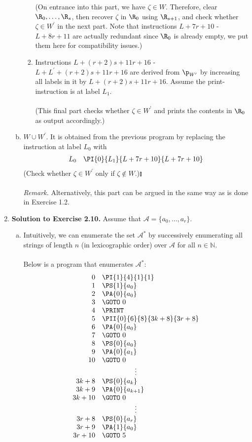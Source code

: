 \begin{enumerate}[1.]
\begin{enumerate}[(a)]
\begin{enumerate}[(1)]
\[\]
(On entrance into this part, we have $\zeta \in W$. Therefore, clear $\R_0, \ldots, \R_s$, then recover $\zeta$ in $\R_0$ using $\R_{s + 1}$, and check whether $\zeta \in W^\prime$ in the next part. Note that instructions $L + 7r + 10$ - $L + 8r + 11$ are actually redundant since $\R_0$ is already empty, we put them here for compatibility issues.)
\item Instructions $L + (r + 2)s + 11r + 16$ - $L + L^\prime + (r + 2)s + 11r + 16$ are derived from $\p_{W^\prime}$ by increasing all labels in it by $L + (r + 2)s + 11r + 16$. Assume the print-instruction is at label $L_1$.\\
\ \\
(This final part checks whether $\zeta \in W^\prime$ and prints the contents in $\R_0$ as output accordingly.)
\end{enumerate}
\item $W \cup W^\prime$. It is obtained from the previous program by replacing the instruction at label $L_0$ with
\[
\begin{array}{rl}
L_0 & \PI{0}{L_1}{L + 7r + 10}{L + 7r + 10}
\end{array}
\]
(Check whether $\zeta \in W^\prime$ only if $\zeta \not\in W$.)\nolinebreak\hfill$\talloblong$\\
\ \\
\textit{Remark.} Alternatively, this part can be argued in the same way as is done in Exercise 1.2.
\end{enumerate}
%
\item \textbf{Solution to Exercise 2.10.} Assume that $\mathcal{A} = \{ a_0, \ldots, a_r \}$.
\begin{enumerate}[(a)]
\item Intuitively, we can enumerate the set $\mathcal{A}^\ast$ by successively enumerating all strings of length $n$ (in lexicographic order) over $\mathcal{A}$ for all $n \in \mathbb{N}$.\\
\ \\
Below is a program that enumerates $\mathcal{A}^\ast$:
\[
\begin{array}{rl}
0 & \PI{1}{4}{1}{1} \cr
1 & \PS{1}{a_0} \cr
2 & \PA{0}{a_0} \cr
3 & \GOTO \ 0 \cr
4 & \PRINT \cr
5 & \PII{0}{6}{8}{3k + 8}{3r + 8} \cr
6 & \PA{0}{a_0} \cr
7 & \GOTO \ 0 \cr
8 & \PS{0}{a_0} \cr
9 & \PA{0}{a_1} \cr
10 & \GOTO \ 0 \cr
\multicolumn{2}{c}{\vdots} \cr
3k + 8 & \PS{0}{a_k} \cr
3k + 9 & \PA{0}{a_{k + 1}} \cr
3k + 10 & \GOTO \ 0 \cr
\multicolumn{2}{c}{\vdots} \cr
3r + 8 & \PS{0}{a_r} \cr
3r + 9 & \PA{1}{a_0} \cr
3r + 10 & \GOTO \ 5 \cr

\end{array}\]
\end{enumerate}
\end{enumerate}
